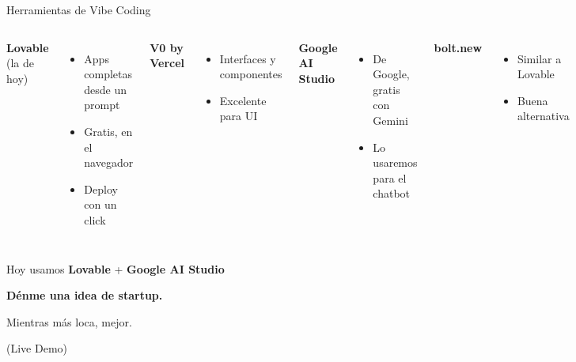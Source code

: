 \documentclass[aspectratio=169]{beamer}
\begin{document}
\begin{frame}{Herramientas de Vibe Coding}
\vspace{0.3cm}

\begin{columns}[T]
{\large\color{accent}\textbf{Lovable}} {\small\color{success}(la de hoy)}
\begin{itemize}
\setlength\itemsep{0.2em}
\item Apps completas desde un prompt
\item Gratis, en el navegador
\item Deploy con un click
\end{itemize}

\vspace{0.4cm}
{\large\color{accentlight}\textbf{V0 by Vercel}}
\begin{itemize}
\setlength\itemsep{0.2em}
\item Interfaces y componentes
\item Excelente para UI
\end{itemize}

{\large\color{accentlight}\textbf{Google AI Studio}}
\begin{itemize}
\setlength\itemsep{0.2em}
\item De Google, gratis con Gemini
\item Lo usaremos para el chatbot
\end{itemize}

\vspace{0.4cm}
{\large\color{accentlight}\textbf{bolt.new}}
\begin{itemize}
\setlength\itemsep{0.2em}
\item Similar a Lovable
\item Buena alternativa
\end{itemize}
\end{columns}

\vspace{0.5cm}
\begin{center}
{\color{textgray} Hoy usamos \textbf{\color{accent}Lovable} + \textbf{\color{accent}Google AI Studio}}
\end{center}
\end{frame}

\begin{frame}[plain]
\begin{center}
\vspace{2.5cm}
{\fontsize{32}{36}\selectfont\color{textwhite}\bfseries D\'enme una idea de startup.}

\vspace{0.8cm}
{\fontsize{20}{24}\selectfont\color{accent} Mientras m\'as loca, mejor.}

\vspace{1.5cm}
{\color{textgray}\large (Live Demo)}
\end{center}
\end{frame}
\end{document}
